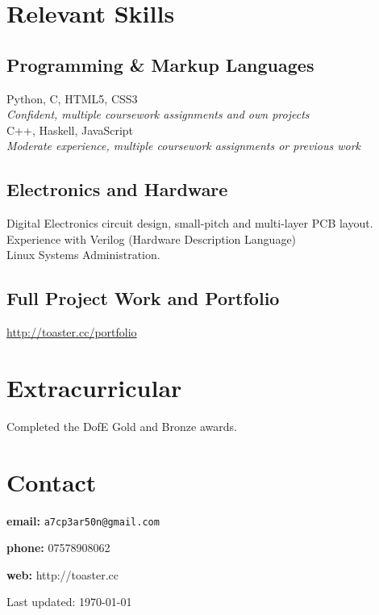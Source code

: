 \documentclass[10pt, a4paper]{article}
\begin{document}
\section*{Relevant Skills}

\subsection*{Programming \& Markup Languages}

Python, C, HTML5, CSS3 \\
\emph{Confident, multiple coursework assignments and own projects}\\
C++, Haskell, JavaScript\\
\emph{Moderate experience, multiple coursework assignments or previous work}

\subsection*{Electronics and Hardware}

Digital Electronics circuit design, small-pitch and multi-layer PCB layout.\\
Experience with Verilog (Hardware Description Language)\\
Linux Systems Administration.

\subsection*{Full Project Work and Portfolio}

\href{http://toaster.cc/portfolio}{http://toaster.cc/portfolio}


\section*{Extracurricular}

Completed the DofE Gold and Bronze awards.



\section*{Contact}

\textbf{email:} {\tt a7cp3ar50n@gmail.com}

\textbf{phone:} 07578908062

\textbf{web:} http://toaster.cc

\vfill{}

\begin{center}
  {
    \scriptsize  Last updated: \today
  }
\end{center}
\end{document}
